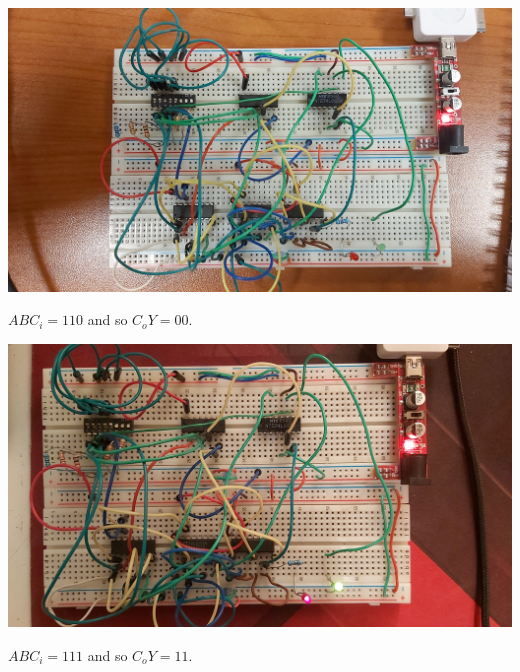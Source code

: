 \documentclass{article}
\begin{document}
\includegraphics[angle=180, width=\textwidth]{./figures/11011.jpg}
\begin{center}
	$ABC_i = 110$ and so $C_o Y= 00$.
\end{center}

\vspace{2em}

\includegraphics[width=\textwidth]{./figures/11111.jpg}
\begin{center}
	$ABC_i = 111$ and so $C_o Y= 11$.
\end{center}﻿
\end{document}
